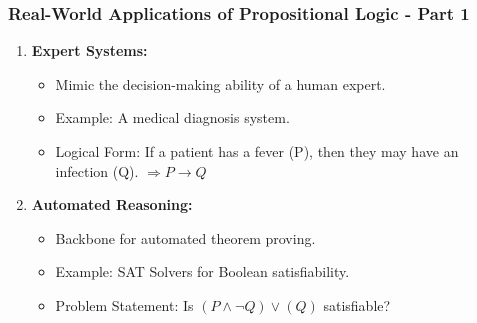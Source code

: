 \documentclass[aspectratio=169]{beamer}
\begin{document}
\begin{frame}[fragile]
    \frametitle{Real-World Applications of Propositional Logic - Part 1}
    \begin{enumerate}
        \item \textbf{Expert Systems:}
            \begin{itemize}
                \item Mimic the decision-making ability of a human expert.
                \item Example: A medical diagnosis system.
                \item Logical Form: If a patient has a fever (P), then they may have an infection (Q). $\Rightarrow P \rightarrow Q$
            \end{itemize}

        \item \textbf{Automated Reasoning:}
            \begin{itemize}
                \item Backbone for automated theorem proving.
                \item Example: SAT Solvers for Boolean satisfiability.
                \item Problem Statement: Is $(P \land \neg Q) \lor (Q)$ satisfiable?
            \end{itemize}
    \end{enumerate}
\end{frame}
\end{document}

